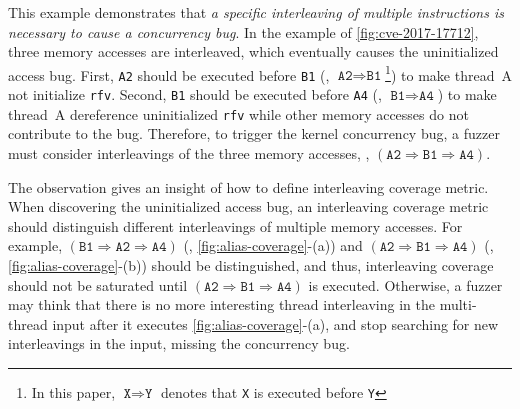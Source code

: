 %
This example demonstrates that \textit{a specific interleaving of
  multiple instructions is necessary to cause a concurrency bug}.
%
In the example of \autoref{fig:cve-2017-17712}, three memory accesses
are interleaved, which eventually causes the uninitialized access bug.
%
First, \texttt{A2} should be executed before \texttt{B1} (\ie,
$\texttt{A2} \Rightarrow \texttt{B1}$\footnote{In this paper,
  $\texttt{X} \Rightarrow \texttt{Y}$ denotes that \texttt{X} is
  executed before \texttt{Y}}) to make thread~A not initialize
\texttt{rfv}.
%
Second, \texttt{B1} should be executed before \texttt{A4} (\ie,
$\texttt{B1} \Rightarrow \texttt{A4}$) to make thread~A dereference
uninitialized \texttt{rfv} while other memory accesses do not
contribute to the bug.
%
Therefore, to trigger the kernel concurrency bug, a fuzzer must
consider interleavings of the three memory accesses, \eg,
$(\texttt{A2} \Rightarrow \texttt{B1} \Rightarrow \texttt{A4})$.


%
The observation gives an insight of how to define interleaving
coverage metric.
%
When discovering the uninitialized access bug, an interleaving
coverage metric should distinguish different interleavings of multiple
memory accesses.
%
For example,
$(\texttt{B1} \Rightarrow \texttt{A2} \Rightarrow \texttt{A4})$ (\ie,
\autoref{fig:alias-coverage}-(a)) and
$(\texttt{A2} \Rightarrow \texttt{B1} \Rightarrow \texttt{A4})$ (\ie,
\autoref{fig:alias-coverage}-(b)) should be distinguished, and thus,
interleaving coverage should not be saturated until
$(\texttt{A2} \Rightarrow \texttt{B1} \Rightarrow \texttt{A4})$ is
executed.
%
Otherwise, a fuzzer may think that there is no more interesting thread
interleaving in the multi-thread input after it executes
\autoref{fig:alias-coverage}-(a), and stop searching for new
interleavings in the input, missing the concurrency bug.
%

